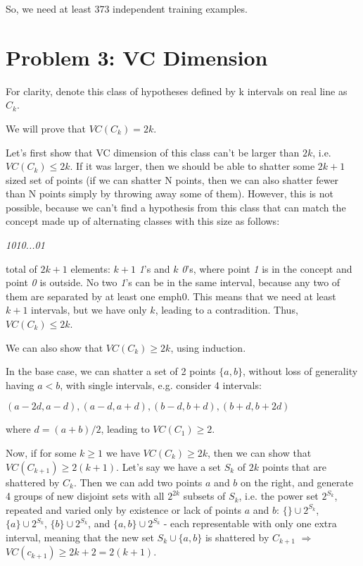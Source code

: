 \documentclass{article}
\begin{document}
So, we need at least 373 independent training examples.

\section*{Problem 3: VC Dimension}
For clarity, denote this class of hypotheses defined by k intervals on real line as $C_k$.

We will prove that $VC(C_k) = 2k$.

Let's first show that VC dimension of this class can't be larger than $2k$, i.e. $VC(C_k) \leq 2k$. If it was larger, then we should be able to shatter some $2k+1$ sized set of points (if we can shatter N points, then we can also shatter fewer than N points simply by throwing away some of them). However, this is not possible, because we can't find a hypothesis from this class that can match the concept made up of alternating classes with this size as follows:

{\centering
\emph{1010...01}\par
}

total of $2k+1$ elements: $k+1$ \emph{1}'s and $k$ \emph{0}'s, where point \emph{1} is in the concept and point \emph{0} is outside. No two \emph{1}'s can be in the same interval, because any two of them are separated by at least one emph{0}. This means that we need at least $k+1$ intervals, but we have only $k$, leading to a contradition. Thus, $VC(C_k) \leq 2k$.

We can also show that $VC(C_k) \geq 2k$, using induction.

In the base case, we can shatter a set of 2 points $\{a, b\}$, without loss of generality having $a < b$, with single intervals, e.g. consider 4 intervals:

{\centering
$(a-2d, a-d), (a-d, a+d), (b-d, b+d), (b+d, b+2d)$\par
}

where $d=(a+b)/2$, leading to $VC(C_1) \geq 2$.

Now, if for some $k \geq 1$ we have $VC(C_k) \geq 2k$, then we can show that $VC(C_{k+1}) \geq 2(k + 1)$.
Let's say we have a set $S_k$ of $2k$ points that are shattered by $C_k$. Then we can add two points $a$ and $b$ on the right, and generate 4 groups of new disjoint sets with all $2^{2k}$ subsets of $S_k$, i.e. the power set $2^{S_k}$, repeated and varied only by existence or lack of points $a$ and $b$: $\{\} \cup  2^{S_k}$, $\{a\} \cup  2^{S_k}$, $\{b\} \cup  2^{S_k}$, and $\{a, b\} \cup  2^{S_k}$ - each representable with only one extra interval, meaning that the new set $S_k \cup \{a,b\}$ is shattered by $C_{k+1}$ $\Rightarrow$  $VC(c_{k+1}) \geq 2k + 2= 2(k + 1)$.
\end{document}
